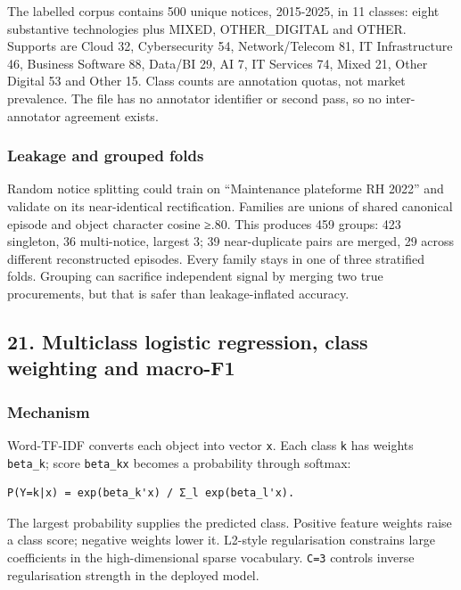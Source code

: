 The labelled corpus contains 500 unique notices, 2015-2025, in 11
classes: eight substantive technologies plus MIXED, OTHER\_DIGITAL and
OTHER. Supports are Cloud 32, Cybersecurity 54, Network/Telecom 81, IT
Infrastructure 46, Business Software 88, Data/BI 29, AI 7, IT Services
74, Mixed 21, Other Digital 53 and Other 15. Class counts are annotation
quotas, not market prevalence. The file has no annotator identifier or
second pass, so no inter-annotator agreement exists.

\subsubsection{Leakage and grouped
folds}\label{leakage-and-grouped-folds}

Random notice splitting could train on ``Maintenance plateforme RH
2022'' and validate on its near-identical rectification. Families are
unions of shared canonical episode and object character cosine ≥.80.
This produces 459 groups: 423 singleton, 36 multi-notice, largest 3; 39
near-duplicate pairs are merged, 29 across different reconstructed
episodes. Every family stays in one of three stratified folds. Grouping
can sacrifice independent signal by merging two true procurements, but
that is safer than leakage-inflated accuracy.

\subsection{21. Multiclass logistic regression, class weighting and
macro-F1}\label{21-multiclass-logistic-regression-class-weighting-and-macro-f1}

\subsubsection{Mechanism}\label{mechanism}

Word-TF-IDF converts each object into vector \texttt{x}. Each class
\texttt{k} has weights \texttt{beta\_k}; score
\texttt{beta\_k\textquotesingle{}x} becomes a probability through
softmax:

\begin{verbatim}
P(Y=k|x) = exp(beta_k'x) / Σ_l exp(beta_l'x).
\end{verbatim}

The largest probability supplies the predicted class. Positive feature
weights raise a class score; negative weights lower it. L2-style
regularisation constrains large coefficients in the high-dimensional
sparse vocabulary. \texttt{C=3} controls inverse regularisation strength
in the deployed model.


